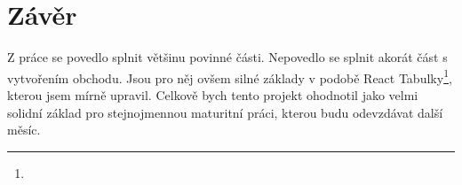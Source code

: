 \chapter*{Závěr}
Z práce se povedlo splnit většinu povinné části. Nepovedlo se splnit akorát část s vytvořením obchodu. Jsou pro něj ovšem silné základy v podobě React Tabulky\footnote{}, kterou jsem mírně upravil. Celkově bych tento projekt ohodnotil jako velmi solidní základ pro stejnojmennou maturitní práci, kterou budu odevzdávat další měsíc.